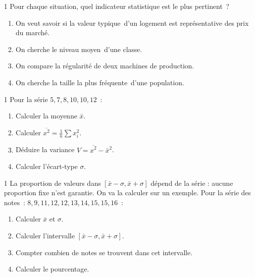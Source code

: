 \begin{exo}{1}
Pour chaque situation, quel indicateur statistique est le plus pertinent~?
\begin{enumerate}
  \item On veut savoir si la \og valeur typique\fg\ d'un logement
        est repr\'esentative des prix du march\'e.
  \item On cherche le niveau \og moyen\fg\ d'une classe.
  \item On compare la r\'egularit\'e de deux machines de production.
  \item On cherche la taille \og la plus fr\'equente\fg\ d'une population.
\end{enumerate}
\end{exo}

\begin{exo}{1}
Pour la s\'erie $5, 7, 8, 10, 10, 12$~:
\begin{enumerate}
  \item Calculer la moyenne $\bar{x}$.
  \item Calculer $\overline{x^2} = \frac{1}{n}\sum x_i^2$.
  \item D\'eduire la variance $V = \overline{x^2} - \bar{x}^2$.
  \item Calculer l'\'ecart-type $\sigma$.
\end{enumerate}
\end{exo}

\begin{exo}{1}
La proportion de valeurs dans $[\bar{x}-\sigma,\bar{x}+\sigma]$
d\'epend de la s\'erie : aucune proportion fixe n'est garantie.
On va la calculer sur un exemple.
Pour la s\'erie des notes~:
$8, 9, 11, 12, 12, 13, 14, 15, 15, 16$~:
\begin{enumerate}
  \item Calculer $\bar{x}$ et $\sigma$.
  \item Calculer l'intervalle $[\bar{x}-\sigma, \bar{x}+\sigma]$.
  \item Compter combien de notes se trouvent dans cet intervalle.
  \item Calculer le pourcentage.
\end{enumerate}
\end{exo}


